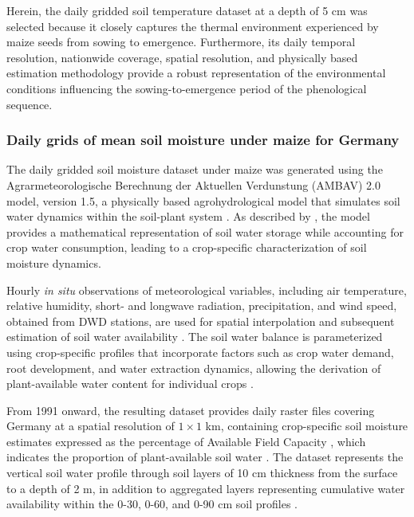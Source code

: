 \documentclass[10pt,authoryear]{elsarticle}
\begin{document}
{		Herein, the daily gridded soil temperature dataset at a depth of 5 cm was selected because it closely captures the thermal environment experienced by maize seeds from sowing to emergence. Furthermore, its daily temporal resolution, nationwide coverage, spatial resolution, and physically based estimation methodology provide a robust representation of the environmental conditions influencing the sowing-to-emergence period of the phenological sequence.
		
		\subsubsection{Daily grids of mean soil moisture under maize for Germany}
		
		
		The daily gridded soil moisture dataset under maize was generated using the Agrarmeteorologische Berechnung der Aktuellen Verdunstung (AMBAV) 2.0 model, version 1.5, a physically based agrohydrological model that simulates soil water dynamics within the soil-plant system \citep{DWD_soilmoisture_maize}. As described by \cite{Herbst_2021}, the model provides a mathematical representation of soil water storage while accounting for crop water consumption, leading to a crop-specific characterization of soil moisture dynamics.
		
		Hourly \textit{in situ} observations of meteorological variables, including air temperature, relative humidity, short- and longwave radiation, precipitation, and wind speed, obtained from DWD stations, are used for spatial interpolation and subsequent estimation of soil water availability \citep{Herbst_2021}. The soil water balance is parameterized using crop-specific profiles that incorporate factors such as crop water demand, root development, and water extraction dynamics, allowing the derivation of plant-available water content for individual crops \citep{Herbst_2021}.
		
		From 1991 onward, the resulting dataset provides daily raster files covering Germany at a spatial resolution of $1 \times 1$ km, containing crop-specific soil moisture estimates expressed as the percentage of Available Field Capacity \citep{DWD_soilmoisture_maize}, which indicates the proportion of plant-available soil water \citep{DWD_nFK}. The dataset represents the vertical soil water profile through soil layers of 10 cm thickness from the surface to a depth of 2 m, in addition to aggregated layers representing cumulative water availability within the 0-30, 0-60, and 0-90 cm soil profiles \citep{DWD_soilmoisture_maize}.
		
}
\end{document}
